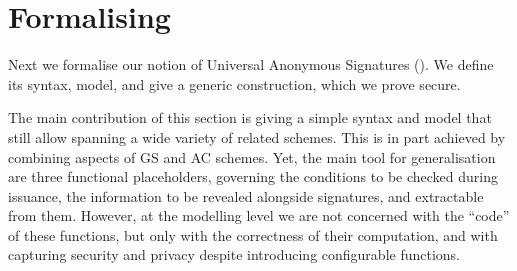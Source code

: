 \section{Formalising \UAS}
\label{sec:formal-uas}


Next we formalise our notion of Universal Anonymous Signatures
(\UAS). We define its syntax, model, and give a generic construction, which
we prove secure. 

The main contribution of this section is giving a simple syntax and model that
still allow spanning a wide variety of related schemes. This is in part
achieved by combining aspects of GS and AC schemes. Yet, the main tool for
generalisation are three functional placeholders, governing the conditions to be
checked during issuance, the information to be revealed alongside signatures,
and extractable from them. However, at the modelling level we are not concerned
with the ``code'' of these functions, but only with the correctness of their
computation, and with capturing security and privacy despite introducing
configurable functions.


